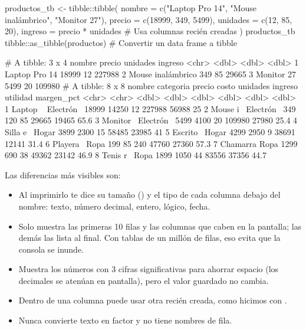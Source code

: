 \begin{rcode}
productos_tb <- tibble::tibble(
  nombre = c("Laptop Pro 14", "Mouse inalámbrico", "Monitor 27"),
  precio = c(18999, 349, 5499),
  unidades = c(12, 85, 20),
  ingreso = precio * unidades     # Usa columnas recién creadas
)
productos_tb
tibble::as_tibble(productos)      # Convertir un data frame a tibble
\end{rcode}
\begin{rsalida}
# A tibble: 3 x 4
  nombre            precio unidades ingreso
  <chr>              <dbl>    <dbl>   <dbl>
1 Laptop Pro 14      18999       12  227988
2 Mouse inalámbrico    349       85   29665
3 Monitor 27          5499       20  109980
# A tibble: 8 x 8
  nombre   categoria precio costo unidades ingreso utilidad margen_pct
  <chr>    <chr>      <dbl> <dbl>    <dbl>   <dbl>    <dbl>      <dbl>
1 Laptop ~ Electrón~  18999 14250       12  227988    56988       25  
2 Mouse i~ Electrón~    349   120       85   29665    19465       65.6
3 Monitor~ Electrón~   5499  4100       20  109980    27980       25.4
4 Silla e~ Hogar       3899  2300       15   58485    23985       41  
5 Escrito~ Hogar       4299  2950        9   38691    12141       31.4
6 Playera~ Ropa         199    85      240   47760    27360       57.3
7 Chamarra Ropa        1299   690       38   49362    23142       46.9
8 Tenis r~ Ropa        1899  1050       44   83556    37356       44.7
\end{rsalida}

Las diferencias más visibles son:

\begin{itemize}
  \item Al imprimirlo te dice su tamaño () y el tipo de cada
        columna debajo del nombre:  texto, 
        número decimal,  entero,  lógico,
         fecha.
  \item Solo muestra las primeras 10 filas y las columnas que caben en la
        pantalla; las demás las lista al final. Con tablas de un millón de
        filas, eso evita que la consola se inunde.
  \item Muestra los números con 3 cifras significativas para ahorrar
        espacio (los decimales se atenúan en pantalla), pero el valor
        guardado no cambia.
  \item Dentro de  una columna puede usar otra recién
        creada, como hicimos con .
  \item Nunca convierte texto en factor y no tiene nombres de fila.
\end{itemize}

